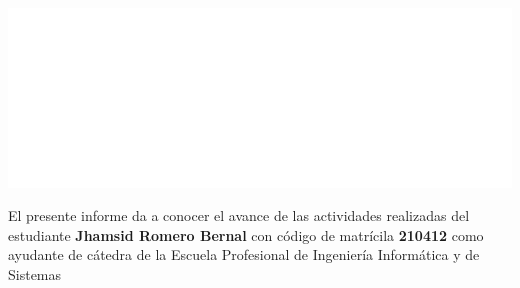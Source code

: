 \documentclass[12pt]{report}
\begin{document}
\pagecolor{primary}   %
\begin{titlepage}
    \centering
    \includegraphics[width = .9\textwidth]{img/logo-unsaac-alt.png}
    
    \vspace{1cm}
    
    \Facultad
    
    \vspace{1cm}
    
    \Carrera
    
    \vspace{2cm}
    
    \linea[1]
    
    \vspace{.5cm}
    
    \tema
    
    \vspace{.5cm}
    
    \linea[1]
    
    \vspace{2cm}
    
    \RaggedRight
    
    \DePara
    
    \vfill
    
    \centering

    \fecha


    

\end{titlepage}


\newpage
\nopagecolor          %


El presente informe da a conocer el avance de las actividades realizadas del estudiante \textbf{Jhamsid Romero Bernal} con código de matrícila \textbf{210412} como ayudante de cátedra de la Escuela Profesional de Ingeniería Informática y de Sistemas



\end{document}
